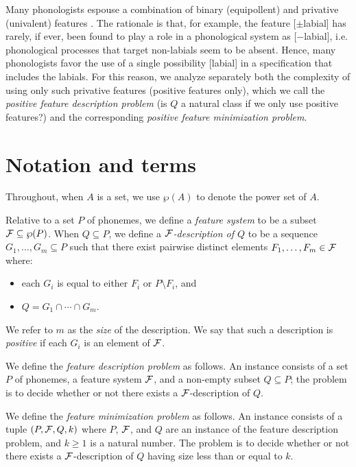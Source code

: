 \documentclass[11pt,a4paper]{article}
\begin{document}
Many phonologists espouse a combination of binary (equipollent) and privative (univalent) features \cite{trubetzkoy1969,ewen1985,goldsmith1985}.  The rationale is that, for example, the feature [$\pm$labial] has rarely, if ever, been found to play a role in a phonological system as [$-$labial], i.e. phonological processes that target non-labials seem to be absent. Hence, many phonologists favor the use of a single possibility [{\sc labial}] in a specification that includes the labials. For this reason, we analyze separately both the complexity of using only such privative features (positive features only), which we call the {\it positive feature description problem} (is $Q$ a natural class if we only use positive features?) and the corresponding {\it positive feature minimization problem}. 

\section{Notation and terms}

Throughout, when $A$ is a set, we use $\wp(A)$ to denote the power set of $A$.

Relative to a set $P$ of phonemes, we define a \emph{feature system} to be a 
subset $\mathcal{F} \subseteq \wp(P)$. When $Q \subseteq P$, we define a \emph{$\mathcal{F}$-description of $Q$}
to be a sequence $G_1, \ldots, G_m \subseteq P$ such that there exist pairwise distinct elements
$F_1, \ldots, F_m \in \mathcal{F}$ where:

\begin{itemize}
\item each $G_i$ is equal to either $F_i$ or $P \setminus F_i$,
and

\item $Q = G_1 \cap \cdots \cap G_m$.

\end{itemize}

We refer to $m$ as the \emph{size} of the description. We say that such a description is \emph{positive} 
if each $G_i$ is an element of $\mathcal{F}$.

We define the \emph{feature description problem} as follows. An instance consists of
a set $P$ of phonemes, a feature system $\mathcal{F}$, and a non-empty subset $Q \subseteq P$;
the problem is to decide whether or not there exists a $\mathcal{F}$-description of $Q$.

We define the \emph{feature minimization problem} as follows. An instance consists of a tuple 
$(P, \mathcal{F}, Q, k)$ where $P$, $\mathcal{F}$, and $Q$ are an instance of the
feature description problem, and $k \geq 1$ is a natural number. The problem is to decide
whether or not there exists a $\mathcal{F}$-description of $Q$ having size less than or equal to $k$.
\end{document}
